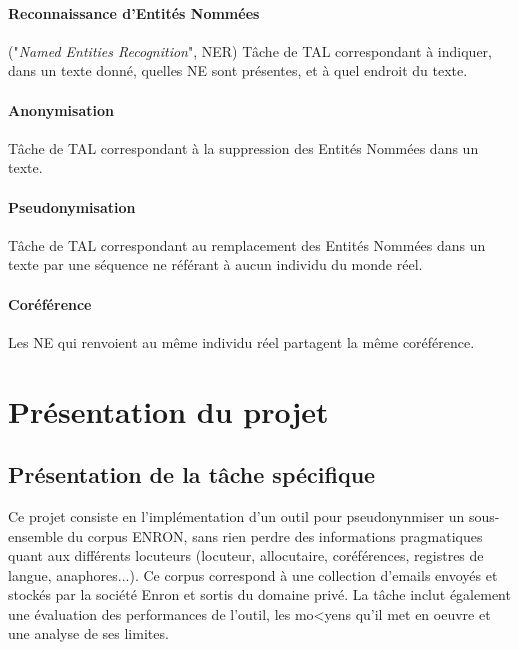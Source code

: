 \documentclass{article}
\begin{document}
\paragraph{Reconnaissance d'Entités Nommées} ("\textit{Named Entities Recognition}", NER) Tâche de TAL correspondant à indiquer, dans un texte donné, quelles NE sont présentes, et à quel endroit du texte.
\paragraph{Anonymisation} Tâche de TAL correspondant à la suppression des Entités Nommées dans un texte.
\paragraph{Pseudonymisation} Tâche de TAL correspondant au remplacement des Entités Nommées dans un texte par une séquence ne référant à aucun individu du monde réel.
\paragraph{Coréférence} Les NE qui renvoient au même individu réel partagent la même coréférence. 


\section{Présentation du projet}
\subsection{Présentation de la tâche spécifique}
Ce projet consiste en l'implémentation d'un outil pour pseudonynmiser un sous-ensemble du corpus ENRON, sans rien perdre des informations pragmatiques quant aux différents locuteurs (locuteur, allocutaire, coréférences, registres de langue, anaphores...).
Ce corpus correspond à une collection d'emails envoyés et stockés par la société Enron et sortis du domaine privé.
La tâche inclut également une évaluation des performances de l'outil, les mo<yens qu'il met en oeuvre et une analyse de ses limites.
\end{document}
